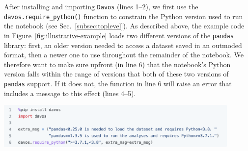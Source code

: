 \documentclass[preprint,12pt,a4paper]{elsarticle}
\begin{document}
After installing and importing \texttt{Davos} (lines 1--2), we first use the \texttt{davos.re\-qui\-re\_\-py\-thon()} function to constrain the Python version used to run the notebook (see Sec.~\ref{subsec:toplevel}).
As described above, the example code in Figure~\ref{fig:illustrative-example} loads two different versions of the \texttt{pandas} library: first, an older version needed to access a dataset saved in an outmoded format, then a newer one to use throughout the remainder of the notebook.
We therefore want to make sure upfront (in line 6) that the notebook's Python version falls within the range of versions that both of these two versions of \texttt{pandas} support.
If it does not, the function in line 6 will raise an error that includes a message to this effect (lines 4--5).
\begin{center}
\includegraphics[width=0.9\textwidth]{figs/example1}
\end{center}
\end{document}

